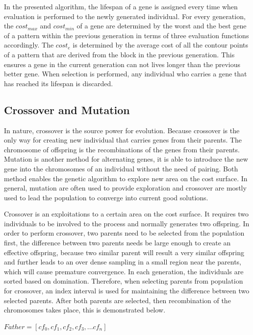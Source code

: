 In the presented algorithm, the lifespan of a gene is assigned every time when evaluation is performed to the newly generated individual.
For every generation, the $cost_{max}$ and $cost_{min}$ of a gene are determined by the worst and the best gene of a pattern within the previous generation in terms of three evaluation functions accordingly. The $cost_{e}$ is determined by the average cost of all the contour points of a pattern that are derived from the block in the previous generation. This ensures a gene in the current generation can not lives longer than the previous better gene. When selection is performed, any individual who carries a gene that has reached its lifespan is discarded.

\subsection{Crossover and Mutation}
In nature, crossover is the source power for evolution. Because crossover is the only way for creating new individual that carries genes from their parents. The chromosome of offspring is the recombinations of the genes from their parents. Mutation is another method for alternating genes, it is able to introduce the new gene into the chromosomes of an individual without the need of pairing. Both method enables the genetic algorithm to explore new area on the cost surface. In general, mutation are often used to provide exploration and crossover are mostly used to lead the population to converge into current good solutions. 

Crossover is an exploitations to a certain area on the cost surface. It requires two individuals to be involved to the process and normally generates two offspring. In order to perform crossover, two parents need to be selected from the population first, the difference between two parents needs be large enough to create an effective offspring, because two similar parent will result a very similar offspring and further leads to an over dense sampling in a small region near the parents, which will cause premature convergence. In each generation, the individuals are sorted based on domination. Therefore, when selecting parents from population for crossover, an index interval is used for maintaining the difference between two selected parents. After both parents are selected, then recombination of the chromosomes takes place, this is demonstrated below. 

$Father = [cf_{0}, cf_{1}, cf_{2}, cf_{3}, ... cf_{n}]$

